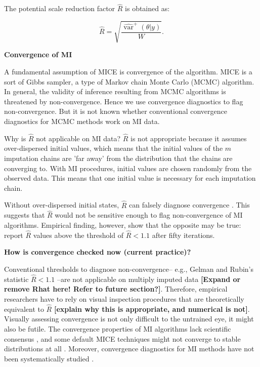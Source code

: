 \documentclass[article]{jss}
\begin{document}
The potential scale reduction factor $\widehat{R}$ is obtained as:

\begin{equation*}
\widehat{R}=\sqrt{\frac{\widehat{\operatorname{var}}^{+}(\theta | y)}{W}}.
\end{equation*}


\textbf{Convergence of MI}

A fundamental assumption of MICE is convergence of the algorithm. MICE is a sort of Gibbs sampler, a type of Markov chain Monte Carlo (MCMC) algorithm. In general, the validity of inference resulting from MCMC algorithms is threatened by non-convergence. Hence we use convergence diagnostics to flag non-convergence. But it is not known whether conventional convergence diagnostics for MCMC methods work on MI data.

Why is $\widehat{R}$ not applicable on MI data? $\widehat{R}$ is not appropriate because it assumes over-dispersed initial values, which means that the initial values of the $m$ imputation chains are 'far away' from the distribution that the chains are converging to. With MI procedures, initial values are chosen randomly from the observed data. This means that one initial value is necessary for each imputation chain.


Without over-dispersed initial states, $\widehat{R}$ can falsely diagnose convergence \citep{broo98}. %
This suggests that $\widehat{R}$ would not be sensitive enough to flag non-convergence of MI algorithms. Empirical finding, however, show that the opposite may be true: \cite{lace07} report $\widehat{R}$ values above the threshold of $\widehat{R} < 1.1$ after fifty iterations. %


\textbf{How is convergence checked now (current practice)?}

Conventional thresholds to diagnose non-convergence-- e.g., Gelman and Rubin's \citeyear{gelm92} statistic $\widehat{R} < 1.1$ --are not applicable on multiply imputed data \citep{lace07} \textbf{[Expand or remove Rhat here! Refer to future section?]}. Therefore, empirical researchers have to rely on visual inspection procedures that are theoretically equivalent to $\widehat{R}$ \citep{whit11} \textbf{[explain why this is appropriate, and numerical is not]}. Visually assessing convergence is not only difficult to the untrained eye, it might also be futile. The convergence properties of MI algorithms lack scientific consensus \citep{taka17}, and some default MICE techniques might not converge to stable distributions at all \citep{murr18}. Moreover, convergence diagnostics for MI methods have not been systematically studied \citep{buur18}.
\end{document}
